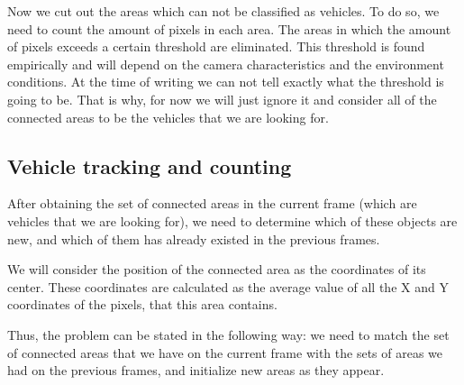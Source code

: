 \documentclass[12pt,a4paper,oneside,titlepage]{article}
\begin{document}
Now we cut out the areas which can not be classified as vehicles.
To do so, we need to count the amount of pixels in each area. The areas in which the amount of pixels exceeds a certain threshold are eliminated.
This threshold is found empirically and will depend on the camera characteristics and the environment conditions.
At the time of writing we can not tell exactly what the threshold is going to be.
That is why, for now we will just ignore it and consider all of the connected areas to be the vehicles that we are looking for. 








\subsection{Vehicle tracking and counting}
After obtaining the set of connected areas in the current frame (which are vehicles that we are looking for), we need to determine which of these objects are new, and which of them has already existed in the previous frames.

We will consider the position of the connected area as the coordinates of its center.
These coordinates are calculated as the average value of all the X and Y coordinates of the pixels, that this area contains.

Thus, the problem can be stated in the following way: we need to match the set of connected areas that we have on the current frame with the sets of areas we had on the previous frames, and initialize new areas as they appear.

\end{document}
